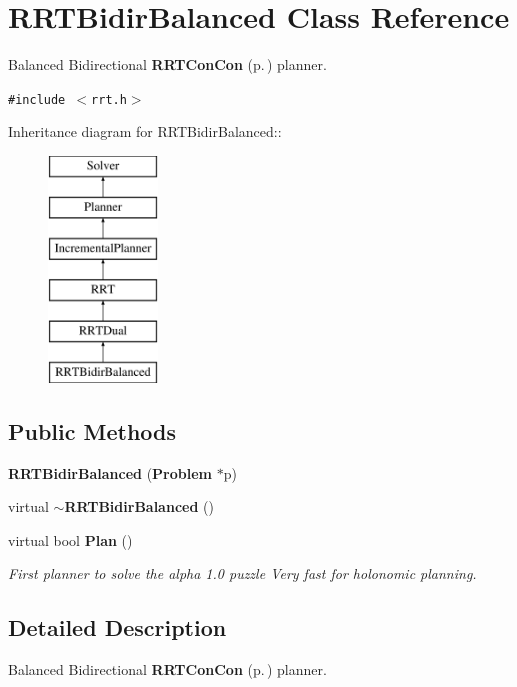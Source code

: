 \section{RRTBidir\-Balanced  Class Reference}
\label{classRRTBidirBalanced}
Balanced Bidirectional {\bf RRTCon\-Con} {\rm (p.\,\pageref{classRRTConCon})} planner. 


{\tt \#include $<$rrt.h$>$}

Inheritance diagram for RRTBidir\-Balanced::\begin{figure}[H]
\begin{center}
\leavevmode
\includegraphics[height=6cm]{classRRTBidirBalanced}
\end{center}
\end{figure}
\subsection*{Public Methods}
\begin{CompactItemize}
\item 
{\bf RRTBidir\-Balanced} ({\bf Problem} $\ast$p)
\item 
virtual {\bf $\sim$RRTBidir\-Balanced} ()
\item 
virtual bool {\bf Plan} ()
\begin{CompactList}\small\item\em First planner to solve the alpha 1.0 puzzle Very fast for holonomic planning.\item\end{CompactList}\end{CompactItemize}


\subsection{Detailed Description}
Balanced Bidirectional {\bf RRTCon\-Con} {\rm (p.\,\pageref{classRRTConCon})} planner.


